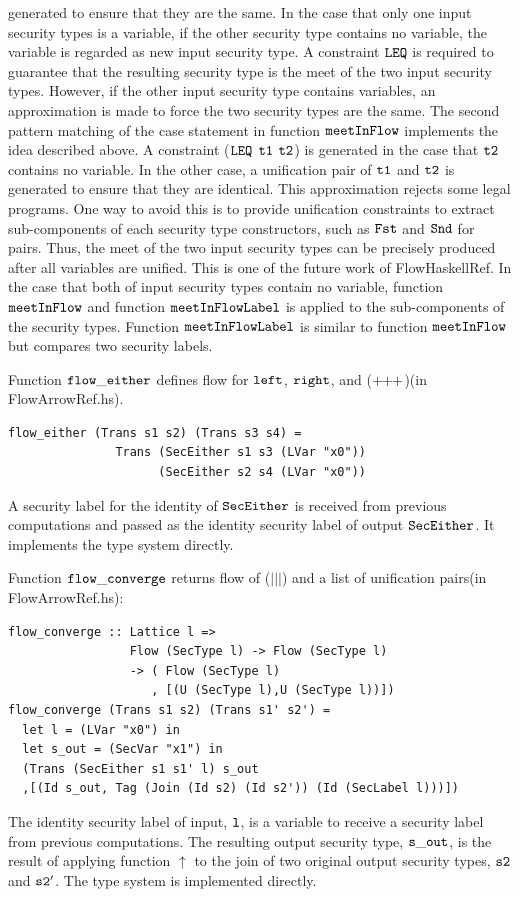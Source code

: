 \documentclass[a4paper]{report}
\newcommand{\arrowop}[1]{$#1\negthickspace #1\negthickspace #1$}
\newcommand{\co}[1]{$\cod{#1}$}
\newcommand{\tagup}{\uparrow}
\begin{document}
generated to ensure that they are the same.
In the case that only one input security types is a variable, if the other security type contains no variable,
the variable is regarded as new input security type. A constraint \co{LEQ} is required to guarantee that the 
resulting security type is the meet of the two input security types. 
However, if the other input security type contains variables, an approximation is made to force the two security
types are the same. 
The second pattern matching of the case statement in function \co{meetInFlow} implements the idea described above.
A constraint (\co{LEQ} \co{t1} \co{t2}) is generated in the case that \co{t2} contains no variable.
In the other case, a unification pair of \co{t1} and \co{t2} is generated to ensure that they are identical.
This approximation rejects some legal programs. One way to avoid this is to provide unification 
constraints to extract sub-components of each security type constructors, such as \co{Fst} and \co{Snd} for pairs.
Thus, the meet of the two input security types can be precisely
produced after all variables are unified. This is one of the future work of FlowHaskellRef.
In the case that both of input security types contain no variable, function \co{meetInFlow} and 
function \co{meetInFlowLabel} is applied to the sub-components of the security types.
Function \co{meetInFlowLabel} is similar to function \co{meetInFlow} but compares two security labels.

Function \co{flow\_either} defines
flow for \co{left}, \co{right}, and (\arrowop{+})(in FlowArrowRef.hs).
\begin{Verbatim}[fontsize=\footnotesize]
flow_either (Trans s1 s2) (Trans s3 s4) = 
               Trans (SecEither s1 s3 (LVar "x0")) 
                     (SecEither s2 s4 (LVar "x0"))
\end{Verbatim}
A security label for the identity of \co{SecEither} is received from previous computations and passed
as the identity security label of output \co{SecEither}. It implements the type system directly.

Function \co{flow\_converge} returns flow of ($|||$) and a list of unification
pairs(in FlowArrowRef.hs):
\begin{Verbatim}[fontsize=\footnotesize]
flow_converge :: Lattice l => 
                 Flow (SecType l) -> Flow (SecType l)
                 -> ( Flow (SecType l)
                    , [(U (SecType l),U (SecType l))])
flow_converge (Trans s1 s2) (Trans s1' s2') =
  let l = (LVar "x0") in
  let s_out = (SecVar "x1") in
  (Trans (SecEither s1 s1' l) s_out
  ,[(Id s_out, Tag (Join (Id s2) (Id s2')) (Id (SecLabel l)))])
\end{Verbatim}
The identity security label of input, \co{l}, is a variable to receive a security label
from previous computations.
The resulting output security type, \co{s\_out}, is the result of applying function $\tagup$ to the join of 
two original output security types, \co{s2} and \co{s2'}.
The type system is implemented directly.
\end{document}
